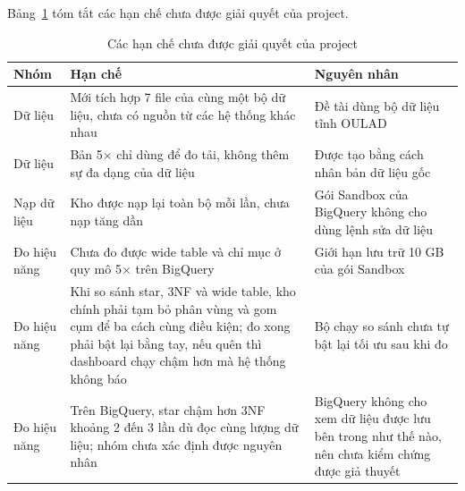 Bảng~\ref{tab:han-che} tóm tắt các hạn chế chưa được giải quyết của project.

\begin{table}[htbp]
\centering
\small
\begin{tabularx}{\textwidth}{|p{2.3cm}|X|X|}
\hline
\textbf{Nhóm} & \textbf{Hạn chế} & \textbf{Nguyên nhân} \\ \hline
Dữ liệu & Mới tích hợp 7 file của cùng một bộ dữ liệu, chưa có nguồn từ các hệ thống khác nhau & Đề tài dùng bộ dữ liệu tĩnh OULAD \\ \hline
Dữ liệu & Bản 5$\times$ chỉ dùng để đo tải, không thêm sự đa dạng của dữ liệu & Được tạo bằng cách nhân bản dữ liệu gốc \\ \hline
Nạp dữ liệu & Kho được nạp lại toàn bộ mỗi lần, chưa nạp tăng dần & Gói Sandbox của BigQuery không cho dùng lệnh sửa dữ liệu \\ \hline
Đo hiệu năng & Chưa đo được wide table và chỉ mục ở quy mô 5$\times$ trên BigQuery & Giới hạn lưu trữ 10 GB của gói Sandbox \\ \hline
Đo hiệu năng & Khi so sánh star, 3NF và wide table, kho chính phải tạm bỏ phân vùng và gom cụm để ba cách cùng điều kiện; đo xong phải bật lại bằng tay, nếu quên thì dashboard chạy chậm hơn mà hệ thống không báo & Bộ chạy so sánh chưa tự bật lại tối ưu sau khi đo \\ \hline
Đo hiệu năng & Trên BigQuery, star chậm hơn 3NF khoảng 2 đến 3 lần dù đọc cùng lượng dữ liệu; nhóm chưa xác định được nguyên nhân & BigQuery không cho xem dữ liệu được lưu bên trong như thế nào, nên chưa kiểm chứng được giả thuyết \\ \hline
\end{tabularx}
\caption{Các hạn chế chưa được giải quyết của project}
\label{tab:han-che}
\end{table}
